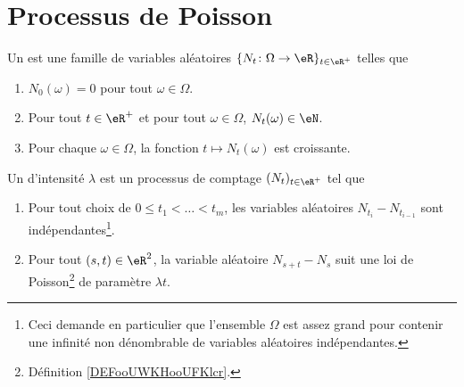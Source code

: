 
\section{Processus de Poisson}
\label{SecHxbtzQ}

\begin{definition}
    Un  est une famille de variables aléatoires \( \{ N_t\colon \Omega\to \eR \}_{t\in \eR^+}\) telles que
    \begin{enumerate}
        \item
            \( N_0(\omega)=0\) pour tout \( \omega\in \Omega\).
        \item
            Pour tout \( t\in \eR^+\) et pour tout \( \omega\in \Omega\), \( N_t(\omega)\in \eN\).
        \item
            Pour chaque \( \omega\in \Omega\), la fonction \( t\mapsto N_t(\omega)\) est croissante.
    \end{enumerate}
\end{definition}

\begin{definition}        \label{DEFooWDXDooRGCtXL}
    Un  d'intensité \( \lambda\) est un processus de comptage \( (N_t)_{t\in \eR^+}\) tel que
    \begin{enumerate}
        \item
            Pour tout choix de \( 0\leq t_1<\ldots < t_m\), les variables aléatoires \( N_{t_i}-N_{t_{i-1}}\) sont indépendantes\footnote{Ceci demande en particulier que l'ensemble \( \Omega\) est assez grand pour contenir une infinité non dénombrable de variables aléatoires indépendantes.}.
        \item
            Pour tout \( (s,t)\in \eR^2\), la variable aléatoire \( N_{s+t}-N_s\) suit une loi de Poisson\footnote{Définition \ref{DEFooUWKHooUFKlcr}.} de paramètre \( \lambda t\).
    \end{enumerate}
\end{definition}

